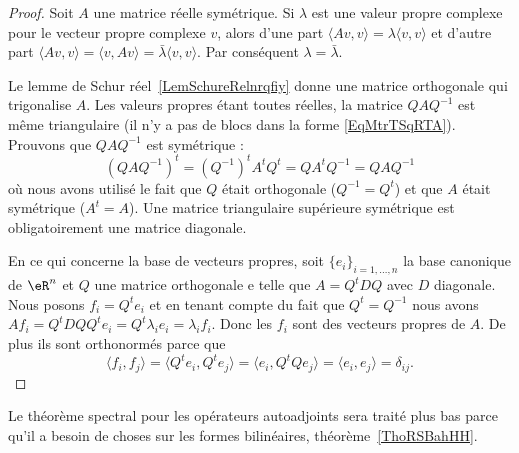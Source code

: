 \begin{proof}
    Soit \( A\) une matrice réelle symétrique. Si \( \lambda\) est une valeur propre complexe pour le vecteur propre complexe \( v\), alors d'une part \( \langle Av, v\rangle =\lambda\langle v, v\rangle \) et d'autre part \( \langle Av, v\rangle =\langle v, Av\rangle =\bar\lambda\langle v, v\rangle \). Par conséquent \( \lambda=\bar\lambda\).

    Le lemme de Schur réel~\ref{LemSchureRelnrqfiy} donne une matrice orthogonale qui trigonalise \( A\). Les valeurs propres étant toutes réelles, la matrice \( QAQ^{-1}\) est même triangulaire (il n'y a pas de blocs dans la forme \eqref{EqMtrTSqRTA}). Prouvons que \( QAQ^{-1}\) est symétrique :
    \begin{equation}
        (QAQ^{-1})^t=(Q^{-1})^tA^tQ^t=QA^tQ^{-1}=QAQ^{-1}
    \end{equation}
    où nous avons utilisé le fait que \( Q\) était orthogonale (\( Q^{-1}=Q^t\)) et que \( A\) était symétrique (\( A^t=A\)). Une matrice triangulaire supérieure symétrique est obligatoirement une matrice diagonale.

    En ce qui concerne la base de vecteurs propres, soit \( \{ e_i \}_{i=1,\ldots, n}\) la base canonique de \( \eR^n\) et \( Q\) une matrice orthogonale e telle que \( A=Q^tDQ\) avec \( D\) diagonale. Nous posons \( f_i=Q^te_i\) et en tenant compte du fait que \( Q^t=Q^{-1}\) nous avons \( Af_i=Q^tDQQ^te_i=Q^t\lambda_i e_i=\lambda_if_i\). Donc les \( f_i\) sont des vecteurs propres de \( A\). De plus ils sont orthonormés parce que
    \begin{equation}
        \langle f_i, f_j\rangle =\langle Q^te_i, Q^te_j\rangle =\langle e_i, Q^tQe_j\rangle =\langle e_i, e_j\rangle =\delta_{ij}.
    \end{equation}
\end{proof}
Le théorème spectral pour les opérateurs autoadjoints sera traité plus bas parce qu'il a besoin de choses sur les formes bilinéaires, théorème~\ref{ThoRSBahHH}.

